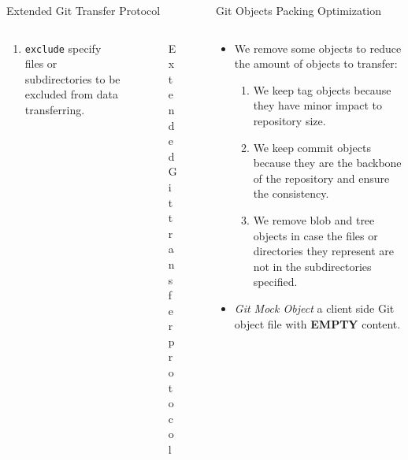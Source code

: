 \documentclass[final]{beamer}
\begin{document}
\begin{frame}[t, fragile]
\begin{columns}[t]
\begin{column}{.5\linewidth}
\begin{block}{Extended Git Transfer Protocol}
\begin{columns}[T]
\begin{column}{.5\textwidth}
\begin{itemize}
\begin{enumerate}
  \item \verb|exclude| specify files or subdirectories to be excluded from data
    transferring.
      \end{enumerate}
\end{itemize}
\end{column}
          \begin{column}{.5\textwidth}
            \begin{figure} \centering
              \caption{Extended Git transfer protocol}
            \end{figure}
          \end{column}
        \end{columns}

      \end{block}
    \end{column}
    \begin{column}{.5\linewidth}
      \begin{block}{Git Objects Packing Optimization}
        \begin{columns}[T]
            \begin{column}{.5\textwidth}
\begin{itemize}
    \justifying
  \item We remove some objects to reduce the amount of objects to transfer:
    \begin{enumerate}
  \item We keep tag objects because they have minor impact to repository size.

  \item We keep commit objects because they are the backbone of the repository
    and ensure the consistency.

  \item We remove blob and tree objects in case the files or directories they
    represent are not in the subdirectories specified.
\end{enumerate}


\item \emph{Git Mock Object} a client side Git object file with \textbf{EMPTY}
  content.


\end{itemize}
\end{column}
\end{columns}
\end{block}
\end{column}
\end{columns}
\end{frame}
\end{document}
